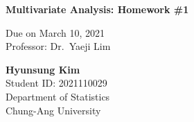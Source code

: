 \documentclass[11pt,a4paper,oneside]{article}
\begin{document}


\begin{titlepage}

    \begin{center}
           \begin{figure}
			\centering
			
		\end{figure}

       \vspace*{1cm}

        \LARGE{
            \textbf{
                                                                                        Multivariate
Analysis: Homework \#1
                                                                    }
        }


       \large{  }

                    \Large{Due on March 10, 2021} \\
                            \Large{Professor: Dr.~Yaeji Lim} \\
        

        \vspace{10cm}

         \Large{\textbf{Hyunsung Kim}}  \\ 
         \Large{Student ID: 2021110029} \\ 
         \Large{Department of Statistics}  \\ 
         \Large{Chung-Ang University}  \\ 

         \vfill
     \end{center}
    \thispagestyle{empty}
\end{titlepage}

\newpage

\tableofcontents

\newpage
\end{document}
